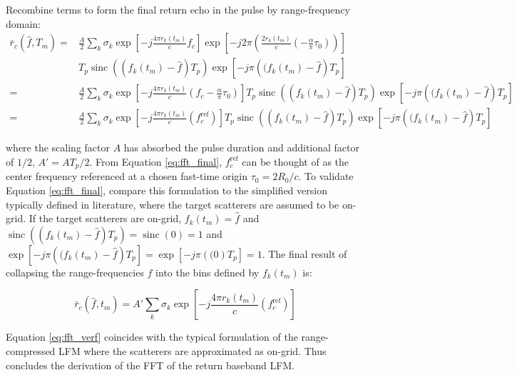 \documentclass[fleqn,10pt]{olplainarticle}
\DeclareMathOperator{\sinc}{sinc}
\begin{document}
\noindent Recombine terms to form the final return echo in the pulse by range-frequency domain:
\begin{equation}
    \begin{aligned}
        \bar{r}_{c}(\hat{f},T_{m}) =& \frac{A}{2} \sum_{k}\sigma_{k} \exp \left[ -j \frac{4\pi r_{k}(t_m)}{c} f_{c}\right] \exp \left[ -j 2\pi \left( \frac{2 r_{k}(t_{m})}{c} \left( - \frac{\alpha}{\pi}\tau_{0} \right) \right)\right]\\ 
        &T_p \sinc ((f_{k}(t_{m})-\hat{f}) T_p)\exp \left[ -j \pi \left( (f_{k}(t_{m})-\hat{f} \right)T_p\right] \\
        =& \frac{A}{2} \sum_{k}\sigma_{k} \exp \left[ -j \frac{4\pi r_{k}(t_m)}{c} \left(f_{c}  - \frac{\alpha}{\pi}\tau_{0} \right)\right] 
        T_p \sinc ((f_{k}(t_{m})-\hat{f}) T_p)\exp \left[ -j \pi \left( (f_{k}(t_{m})-\hat{f} \right)T_p\right]\\
        =& \frac{A}{2} \sum_{k}\sigma_{k} \exp \left[ -j \frac{4\pi r_{k}(t_m)}{c} \left(f_{c}^{\text{ref}}\right)\right] 
        T_p \sinc ((f_{k}(t_{m})-\hat{f}) T_p)\exp \left[ -j \pi \left( (f_{k}(t_{m})-\hat{f} \right)T_p\right]
    \end{aligned}
    \label{eq:fft_final}
\end{equation}

\noindent where the scaling factor $A$ has absorbed the pulse duration and additional factor of $1/2$, $A' = AT_p/2$. From Equation \ref{eq:fft_final}, $f_{c}^{\text{ref}}$ can be thought of as the center frequency referenced at a chosen fast-time origin $\tau_{0} = 2R_{0}/c$. To validate Equation \ref{eq:fft_final}, compare this formulation to the simplified version typically defined in literature, where the target scatterers are assumed to be on-grid. If the target scatterers are on-grid, $f_{k}(t_{m}) = \hat{f}$ and $\sinc ((f_{k}(t_{m})-\hat{f}) T_p) = \sinc (0) = 1$ and $\exp \left[ -j \pi \left( (f_{k}(t_{m})-\hat{f} \right)T_p\right] = \exp \left[ -j \pi \left( (0 \right)T_p\right] = 1$. The final result of collapsing the range-frequencies $\hat{f}$ into the bins defined by $f_{k}(t_{m})$ is:

\begin{equation}
    \bar{r}_{c}(\hat{f}, t_{m}) = A' \sum_{k}\sigma_{k} \exp \left[ -j \frac{4\pi r_{k}(t_m)}{c} \left(f_{c}^{\text{ref}}\right)\right] 
    \label{eq:fft_verf}
\end{equation}

\noindent Equation \ref{eq:fft_verf} coincides with the typical formulation of the range-compressed LFM where the scatterers are approximated as on-grid. Thus concludes the derivation of the FFT of the return baseband LFM.
\end{document}
